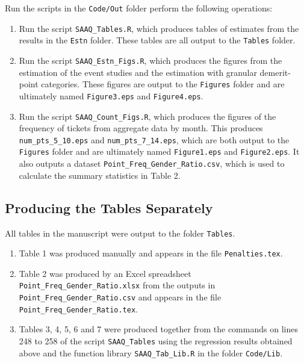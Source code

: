 \documentclass[11pt]{paper}
\begin{document}
Run the scripts in the \texttt{Code/Out} folder
perform the following operations:


\begin{enumerate}

\item  Run the script \texttt{SAAQ\_Tables.R}, which
    produces tables of estimates from the results in
    the \texttt{Estn} folder. 
    These tables are all output to the \texttt{Tables} folder. 
\item  Run the script \texttt{SAAQ\_Estn\_Figs.R}, which
    produces the
    figures from the estimation of the event studies and 
    the estimation with granular demerit-point categories.
    These figures are output to the \texttt{Figures} folder
    and are ultimately named 
    \texttt{Figure3.eps} and \texttt{Figure4.eps}. 
\item  Run the script \texttt{SAAQ\_Count\_Figs.R}, which 
    produces the
    figures of the frequency of tickets
    from aggregate data by month. 
    This produces \texttt{num\_pts\_5\_10.eps} 
    and \texttt{num\_pts\_7\_14.eps},
    which are both output to the \texttt{Figures} folder
    and are ultimately named 
    \texttt{Figure1.eps} and \texttt{Figure2.eps}. 
    It also outputs a dataset 
	\texttt{Point\_Freq\_Gender\_Ratio.csv}, 
	which is used to calculate
    the summary statistics in Table 2. 

\end{enumerate}




\subsection*{Producing the Tables Separately}

All tables in the manuscript were output to the folder \texttt{Tables}.

\begin{enumerate}

\item  Table 1 was produced manually 
    and appears in the file \texttt{Penalties.tex}.
\item  Table 2 was produced by an Excel spreadsheet
    \texttt{Point\_Freq\_Gender\_Ratio.xlsx} from the outputs in 
    \texttt{Point\_Freq\_Gender\_Ratio.csv} and appears in the file 
    \texttt{Point\_Freq\_Gender\_Ratio.tex}.
\item  Tables 3, 4, 5, 6 and 7 were produced together from
    the commands on lines 248 to 258 of the script \texttt{SAAQ\_Tables}
    using the regression results obtained above
    and the function library \texttt{SAAQ\_Tab\_Lib.R} 
    in the folder \texttt{Code/Lib}. 

\end{enumerate}
\end{document}
